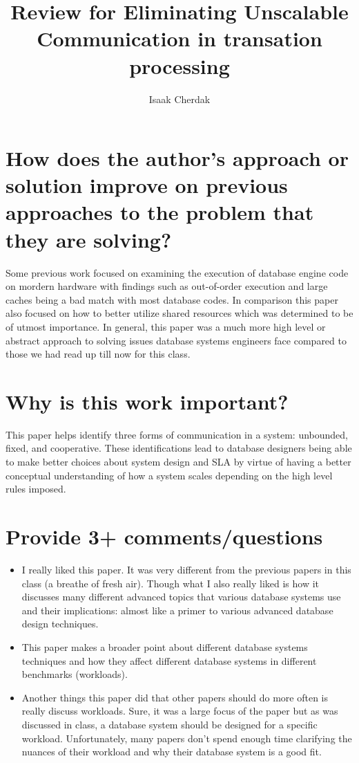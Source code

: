 \documentclass{article}
\title{Review for Eliminating Unscalable Communication in transation processing}
\author{Isaak Cherdak}
\begin{document}
\maketitle

\tableofcontents

\pagebreak

\section{How does the author's approach or solution improve on previous
approaches to the problem that they are solving?}

Some previous work focused on examining the execution of database engine code on
mordern hardware with findings such as out-of-order execution and large caches
being a bad match with most database codes. In comparison this paper also
focused on how to better utilize shared resources which was determined to be of
utmost importance. In general, this paper was a much more high level or abstract
approach to solving issues database systems engineers face compared to those we
had read up till now for this class.

\section{Why is this work important?}

This paper helps identify three forms of communication in a system: unbounded,
fixed, and cooperative. These identifications lead to database designers being
able to make better choices about system design and SLA by virtue of having a
better conceptual understanding of how a system scales depending on the high
level rules imposed.

\section{Provide 3+ comments/questions}

\begin{itemize}
  \item I really liked this paper. It was very different from the previous
    papers in this class (a breathe of fresh air). Though what I also really
    liked is how it discusses many different advanced topics that various
    database systems use and their implications: almost like a primer to
    various advanced database design techniques.
  \item This paper makes a broader point about different database systems
    techniques and how they affect different database systems in different
    benchmarks (workloads).
  \item Another things this paper did that other papers should do more often is
    really discuss workloads. Sure, it was a large focus of the paper but as was
    discussed in class, a database system should be designed for a specific
    workload. Unfortunately, many papers don't spend enough time clarifying
    the nuances of their workload and why their database system is a
    good fit.
\end{itemize}
\end{document}
